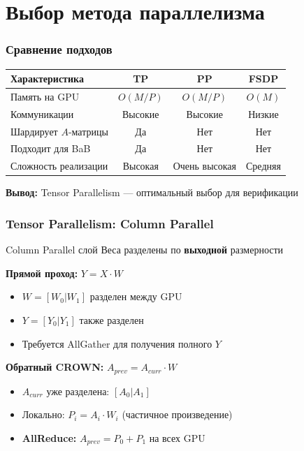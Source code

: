 
\section{Выбор метода параллелизма}

\begin{frame}
\frametitle{Сравнение подходов}

\begin{table}[h]
\centering
\scriptsize
\begin{tabular}{|l|c|c|c|}
\hline
\textbf{Характеристика} & \textbf{TP} & \textbf{PP} & \textbf{FSDP} \\
\hline
Память на GPU & $O(M/P)$ & $O(M/P)$ & $O(M)$ \\
\hline
Коммуникации & Высокие & Высокие & Низкие \\
\hline
Шардирует $A$-матрицы & Да & Нет & Нет \\
\hline
Подходит для BaB & Да & Нет & Нет \\
\hline
Сложность реализации & Высокая & Очень высокая & Средняя \\
\hline
\end{tabular}
\end{table}

\vspace{0.5cm}

\textbf{Вывод:} Tensor Parallelism --- оптимальный выбор для верификации

\end{frame}

\begin{frame}
\frametitle{Tensor Parallelism: Column Parallel}

\begin{block}{Column Parallel слой}
Веса разделены по \textbf{выходной} размерности
\end{block}

\vspace{0.3cm}

\textbf{Прямой проход:} $Y = X \cdot W$
\begin{itemize}
    \item $W = [W_0 | W_1]$ разделен между GPU
    \item $Y = [Y_0 | Y_1]$ также разделен
    \item Требуется AllGather для получения полного $Y$
\end{itemize}

\vspace{0.3cm}

\textbf{Обратный CROWN:} $A_{prev} = A_{curr} \cdot W$
\begin{itemize}
    \item $A_{curr}$ уже разделена: $[A_0 | A_1]$
    \item Локально: $P_i = A_i \cdot W_i$ (частичное произведение)
    \item \textbf{AllReduce:} $A_{prev} = P_0 + P_1$ на всех GPU
\end{itemize}

\end{frame}

